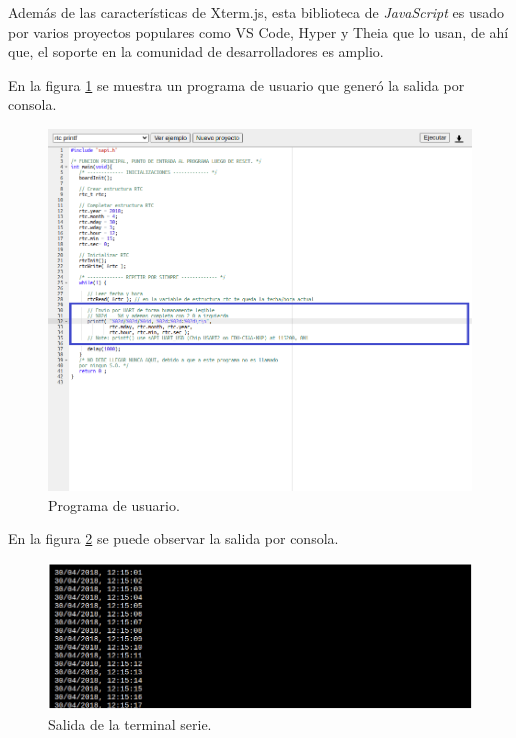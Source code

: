 Además de las características de Xterm.js, esta biblioteca de \textit{JavaScript} es usado por varios proyectos populares como VS Code, Hyper y Theia que lo usan, de ahí que, el soporte en la comunidad de desarrolladores es amplio.

En la figura \ref{fig:Terminal1} se muestra un programa de usuario que generó la salida por consola.

\begin{figure}[ht]
	\centering
	\includegraphics[scale=.41]{./Figures/Terminal1.png}
	\caption{Programa de usuario.}
	\label{fig:Terminal1}
\end{figure}
 


En la figura \ref{fig:Terminal2} se puede observar la salida por consola.

\begin{figure}[ht]
	\centering
	\includegraphics[scale=.45]{./Figures/Terminal2.png}
	\caption{Salida de la terminal serie.}
	\label{fig:Terminal2}
\end{figure}
 
